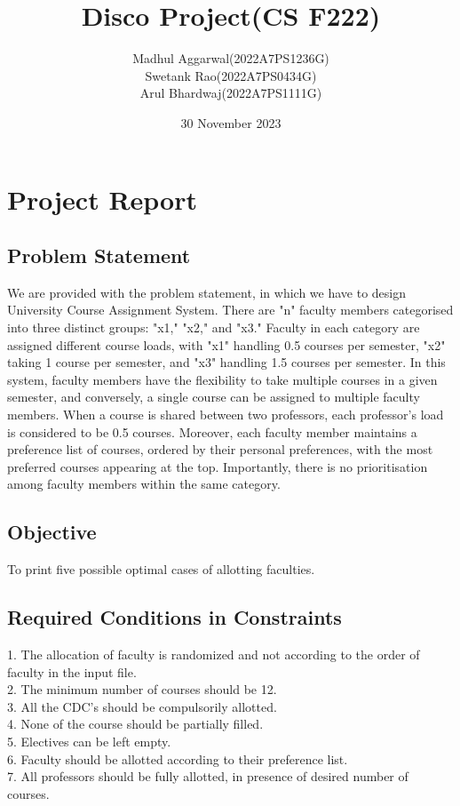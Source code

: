 \documentclass{article}
\title{Disco Project(CS F222)}
\author{Madhul Aggarwal(2022A7PS1236G)\\ Swetank Rao(2022A7PS0434G) \\ Arul Bhardwaj(2022A7PS1111G)}
\date{30 November 2023}
\begin{document}
\maketitle

\section{Project Report}
\subsection{
Problem Statement
}
We are provided with the problem statement, in which we have to design University Course Assignment System. There are "n" faculty members categorised into three distinct groups: "x1," "x2," and "x3." Faculty in each category are assigned different course loads, with "x1" handling 0.5 courses per semester, "x2" taking 1 course per semester, and "x3" handling 1.5 courses per semester.
In this system, faculty members have the flexibility to take multiple courses in a given semester, and conversely, a single course can be assigned to multiple faculty members. When a course is shared between two professors, each professor's load is considered to be 0.5 courses. Moreover, each faculty member maintains a preference list of courses, ordered by their personal preferences, with the most preferred courses appearing at the top. Importantly, there is no prioritisation among faculty members within the same category. 
\subsection{Objective}
To print five possible optimal cases of allotting faculties.
\subsection{
Required Conditions in Constraints
}

1. The allocation of faculty is randomized and not according to the order of        faculty in the input file.\\
2. The minimum number of courses should be 12.\\
3. All the CDC's should be compulsorily allotted.\\
4. None of the course should be partially filled.\\
5. Electives can be left empty.\\
6. Faculty should be allotted according to their preference list.\\
7. All professors should be fully allotted, in presence of desired number of courses.
\end{document}
